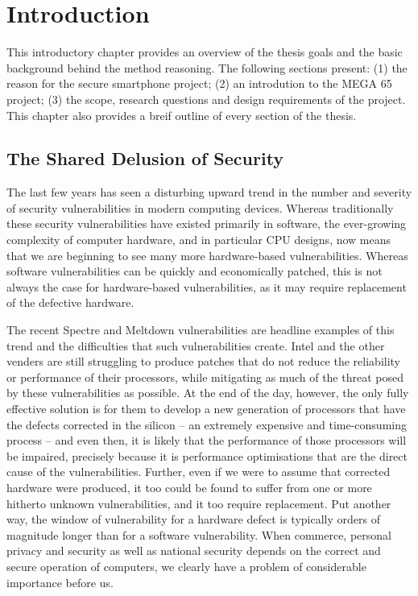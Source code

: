 
\chapter{Introduction} %

\label{Chapter1} %


This introductory chapter provides an overview of the thesis goals and the basic background behind the method reasoning. The following sections present: (1) the reason for the secure smartphone project; (2) an introdution to the MEGA 65 project; (3) the scope, research questions and design requirements of the project. This chapter also provides a breif outline of every section of the thesis. 

\section{The Shared Delusion of Security}

	The last few years has seen a disturbing upward trend in the number and severity of security vulnerabilities in modern computing devices. Whereas traditionally these security vulnerabilities have existed primarily in software, the ever-growing complexity of computer hardware, and in particular CPU designs, now means that we are beginning to see many more hardware-based vulnerabilities.  Whereas software vulnerabilities can be quickly and economically patched, this is not always the case for hardware-based vulnerabilities, as it may require replacement of the defective hardware.  

The recent Spectre and Meltdown vulnerabilities are headline examples of this trend and the difficulties that such vulnerabilities create. Intel and the other venders are still struggling to produce patches that do not reduce the reliability or performance of their processors, while mitigating as much of the threat posed by these vulnerabilities as possible.  At the end of the day, however, the only fully effective solution is for them to develop a new generation of processors that have the defects corrected in the silicon – an extremely expensive and time-consuming process – and even then, it is likely that the performance of those processors will be impaired, precisely because it is performance optimisations that are the direct cause of the vulnerabilities.  Further, even if we were to assume that corrected hardware were produced, it too could be found to suffer from one or more hitherto unknown vulnerabilities, and it too require replacement.  Put another way, the window of vulnerability for a hardware defect is typically orders of magnitude longer than for a software vulnerability. When commerce, personal privacy and security as well as national security depends on the correct and secure operation of computers, we clearly have a problem of considerable importance before us.

